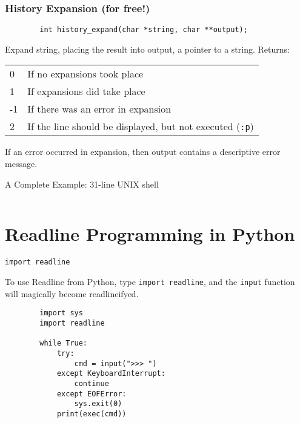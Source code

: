 \documentclass[aspectratio=1610]{beamer}
\begin{document}
\begin{frame}[fragile]
    \frametitle{History Expansion (for free!)}
    \begin{verbatim}
        int history_expand(char *string, char **output);
    \end{verbatim}

    Expand string, placing the result into output, a pointer to a string.  Returns:
    \begin{tabular}{l l}
        0 &    If no expansions took place \\
        1 &    If expansions did take place \\
        -1 &   If there was an error in expansion \\
        2 &    If the line should be displayed, but not executed (\texttt{:p}) \\
    \end{tabular}

    If an error occurred in expansion, then output contains a descriptive error
    message.
\end{frame}

\begin{frame}[fragile]{A Complete Example: 31-line UNIX shell}
    \tiny
    \inputminted[linenos]{c}{codesnip/progexample.c}
\end{frame}

\section{Readline Programming in Python}

\begin{frame}[fragile]{\texttt{import readline}}

    To use Readline from Python, type \texttt{import readline}, and the
    \texttt{input} function will magically become readlineifyed.

    \begin{verbatim}
        import sys
        import readline

        while True:
            try:
                cmd = input(">>> ")
            except KeyboardInterrupt:
                continue
            except EOFError:
                sys.exit(0)
            print(exec(cmd))
    \end{verbatim}
\end{frame}
\end{document}
